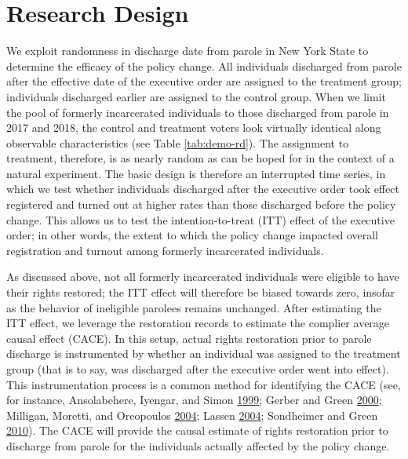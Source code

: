\documentclass[
  12pt,
]{article}
\begin{document}
\hypertarget{research-design}{%
\section*{Research Design}\label{research-design}}

We exploit randomness in discharge date from parole in New York State to determine the efficacy of the policy change. All individuals discharged from parole after the effective date of the executive order are assigned to the treatment group; individuals discharged earlier are assigned to the control group. When we limit the pool of formerly incarcerated individuals to those discharged from parole in 2017 and 2018, the control and treatment voters look virtually identical along observable characteristics (see Table \ref{tab:demo-rd}). The assignment to treatment, therefore, is as nearly random as can be hoped for in the context of a natural experiment. The basic design is therefore an interrupted time series, in which we test whether individuals discharged after the executive order took effect registered and turned out at higher rates than those discharged before the policy change. This allows us to test the intention-to-treat (ITT) effect of the executive order; in other words, the extent to which the policy change impacted overall registration and turnout among formerly incarcerated individuals.

As discussed above, not all formerly incarcerated individuals were eligible to have their rights restored; the ITT effect will therefore be biased towards zero, insofar as the behavior of ineligible parolees remains unchanged. After estimating the ITT effect, we leverage the restoration records to estimate the complier average causal effect (CACE). In this setup, actual rights restoration prior to parole discharge is instrumented by whether an individual was assigned to the treatment group (that is to say, was discharged after the executive order went into effect). This instrumentation process is a common method for identifying the CACE (see, for instance, Ansolabehere, Iyengar, and Simon \protect\hyperlink{ref-Ansolabehere1999}{1999}; Gerber and Green \protect\hyperlink{ref-Gerber2000}{2000}; Milligan, Moretti, and Oreopoulos \protect\hyperlink{ref-Milligan2004}{2004}; Lassen \protect\hyperlink{ref-Lassen2004}{2004}; Sondheimer and Green \protect\hyperlink{ref-Sondheimer2010}{2010}). The CACE will provide the causal estimate of rights restoration prior to discharge from parole for the individuals actually affected by the policy change.
\end{document}
